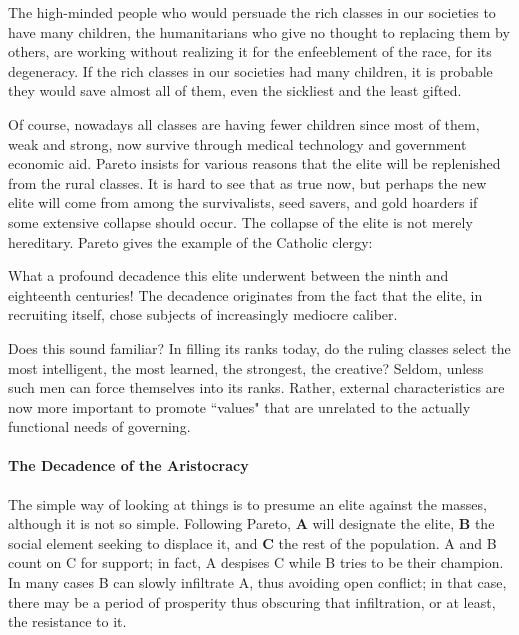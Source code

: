 \begin{quotex}
The high-minded people who would persuade the rich classes in our societies to have many children, the humanitarians who give no thought to replacing them by others, are working without realizing it for the enfeeblement of the race, for its degeneracy. If the rich classes in our societies had many children, it is probable they would save almost all of them, even the sickliest and the least gifted. 

\end{quotex}
Of course, nowadays all classes are having fewer children since most of them, weak and strong, now survive through medical technology and government economic aid. Pareto insists for various reasons that the elite will be replenished from the rural classes. It is hard to see that as true now, but perhaps the new elite will come from among the survivalists, seed savers, and gold hoarders if some extensive collapse should occur. The collapse of the elite is not merely hereditary. Pareto gives the example of the Catholic clergy:

\begin{quotex}
What a profound decadence this elite underwent between the ninth and eighteenth centuries! The decadence originates from the fact that the elite, in recruiting itself, chose subjects of increasingly mediocre caliber. 

\end{quotex}
Does this sound familiar? In filling its ranks today, do the ruling classes select the most intelligent, the most learned, the strongest, the creative? Seldom, unless such men can force themselves into its ranks. Rather, external characteristics are now more important to promote ``values" that are unrelated to the actually functional needs of governing.

\paragraph{The Decadence of the Aristocracy}
The simple way of looking at things is to presume an elite against the masses, although it is not so simple. Following Pareto, \textbf{A} will designate the elite, \textbf{B} the social element seeking to displace it, and \textbf{C} the rest of the population. A and B count on C for support; in fact, A despises C while B tries to be their champion. In many cases B can slowly infiltrate A, thus avoiding open conflict; in that case, there may be a period of prosperity thus obscuring that infiltration, or at least, the resistance to it.

